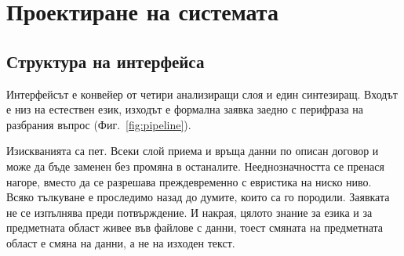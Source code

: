 \section{Проектиране на системата}
\label{sec:design}

\subsection{Структура на интерфейса}

Интерфейсът е конвейер от четири анализиращи слоя и един синтезиращ. Входът е низ на
естествен език, изходът е формална заявка заедно с перифраза на разбрания въпрос
(Фиг.~\ref{fig:pipeline}).

Изискванията са пет. Всеки слой приема и връща данни по описан договор и може да бъде
заменен без промяна в останалите. Нееднозначността се пренася нагоре, вместо да се
разрешава преждевременно с евристика на ниско ниво. Всяко тълкуване е проследимо назад до
думите, които са го породили. Заявката не се изпълнява преди потвърждение. И накрая, цялото
знание за езика и за предметната област живее във файлове с данни, тоест смяната на
предметната област е смяна на данни, а не на изходен текст.

